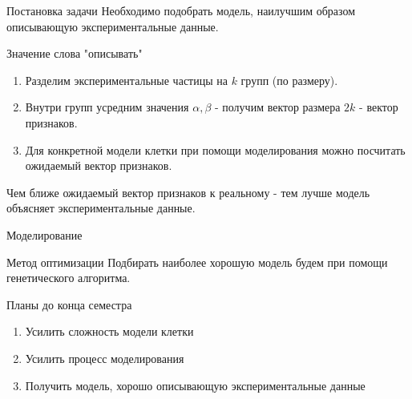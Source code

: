 \documentclass[12pt]{beamer}
\begin{document}
\begin{frame}{Постановка задачи}
	Необходимо подобрать модель, наилучшим образом описывающую экспериментальные данные.
\end{frame}

\begin{frame}{Значение слова "описывать"}
	\begin{enumerate}
		\item Разделим экспериментальные частицы на $k$ групп (по размеру). 
		\item Внутри групп усредним значения $\alpha, \beta$ - получим вектор размера $2k$ - вектор признаков. 
		\item Для конкретной модели клетки при помощи моделирования можно посчитать ожидаемый вектор признаков. 
	\end{enumerate}
	Чем ближе ожидаемый вектор признаков к реальному - тем лучше модель объясняет экспериментальные данные.  
\end{frame}

\begin{frame}{Моделирование}
	\begin{figure}
		\centering 
		\label{image2}
	\end{figure}
\end{frame}

\begin{frame}{Метод оптимизации}
	Подбирать наиболее хорошую модель будем при помощи генетического алгоритма.
\end{frame}

\begin{frame}{Планы до конца семестра}
	\begin{enumerate}
	\item Усилить сложность модели клетки
	\item Усилить процесс моделирования 
	\item Получить модель, хорошо описывающую экспериментальные данные 
	\end{enumerate}
\end{frame}
\end{document}
